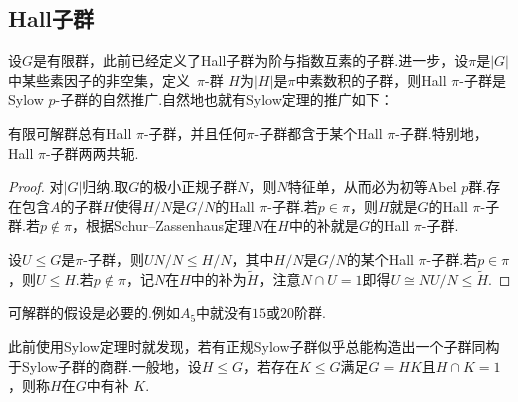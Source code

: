 \subsection{Hall子群}
设$G$是有限群，此前已经定义了{\heiti Hall子群}为阶与指数互素的子群.进一步，设$\pi$是$|G|$中某些素因子的非空集，定义~{\heiti $\pi$-群} $H$为$|H|$是$\pi$中素数积的子群，则Hall $\pi$-子群是Sylow $p$-子群的自然推广.自然地也就有Sylow定理的推广如下：
\begin{thm}[(Hall)]
	有限可解群总有Hall $\pi$-子群，并且任何$\pi$-子群都含于某个Hall $\pi$-子群.特别地，Hall $\pi$-子群两两共轭.\hypertarget{thm:Hall}{}
\end{thm}
\begin{proof}
	对$|G|$归纳.取$G$的极小正规子群$N$，则$N$特征单，从而必为初等Abel $p$群.存在包含$A$的子群$H$使得$H/N$是$G/N$的Hall $\pi$-子群.若$p\in\pi$，则$H$就是$G$的Hall $\pi$-子群.若$p\notin \pi$，根据Schur--Zassenhaus定理$N$在$H$中的补就是$G$的Hall $\pi$-子群.

	设$U\le G$是$\pi$-子群，则$UN/N\le H/N$，其中$H/N$是$G/N$的某个Hall $\pi$-子群.若$p\in\pi$，则$U\le H$.若$p\notin\pi$，记$N$在$H$中的补为$\tilde H$，注意$N\cap U=1$即得$U\cong NU/N\le \tilde H$.
\end{proof}
\begin{remark}
	可解群的假设是必要的.例如$A_5$中就没有$15$或$20$阶群.
\end{remark}

此前使用Sylow定理时就发现，若有正规Sylow子群似乎总能构造出一个子群同构于Sylow子群的商群.一般地，设$H\le G$，若存在$K\le G$满足$G=HK$且$H\cap K=1$，则称$H$在$G$中有{\heiti 补} $K$.

